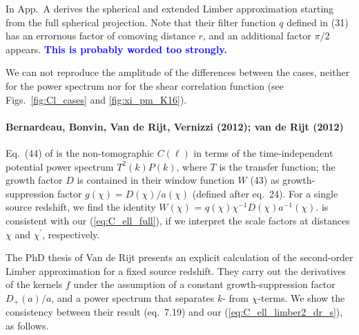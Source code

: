 \documentclass[fleqn,usenatbib]{mnras} %
\newcommand{\mk}[1]{{\bf\textcolor{blue}{#1}}}
\begin{document}
\begin{appendix}
In App.~A \cite{2016arXiv161104954K} derives the spherical and extended
Limber approximation starting from the full spherical projection. Note that
their filter function $q$ defined in (31) has an errornous factor of comoving
distance $r$, and an additional factor $\pi/2$ appears. \mk{This is probably worded
too strongly.}

We can not reproduce the amplitude of the differences between the cases,
neither for the power spectrum nor for the shear correlation function (see
Figs.~\ref{fig:Cl_cases} and \ref{fig:xi_pm_K16}).


\paragraph{Bernardeau, Bonvin, Van de Rijt, Vernizzi (2012); van de Rijt (2012)}

Eq.~(44) of \cite{2012PhRvD..86b3001B} is the non-tomographic $C(\ell)$ in
terms of the time-independent potential power spectrum $T^2(k) P(k)$, where $T$
is the transfer function; the growth factor $D$ is contained in their window
function $W$ (43) as growth-suppression factor $g(\chi) = D(\chi)/a(\chi)$
(defined after eq.~{24}). For a single source redshift, we find the identity
$W(\chi)$ = $q(\chi)\chi^{-1} D(\chi) a^{-1}(\chi)$.
\cite{2012PhRvD..86b3001B} is consistent with our
(\ref{eq:C_ell_full}), if we interpret the
scale factors at distances $\chi$ and $\chi^\prime$, respectively.

The PhD thesis of Van de Rijt \cite{vande2012} presents an explicit calculation
of the second-order Limber approximation for a fixed source redshift. They
carry out the derivatives of the kernels $f$ under the assumption of a constant
growth-suppression factor $D_+(a)/a$, and a power spectrum that separates $k$-
from $\chi$-terms. We show the consistency between their result (eq.~7.19) and
our (\ref{eq:C_ell_limber2_dr_s}), as follows.


\end{appendix}
\end{document}
